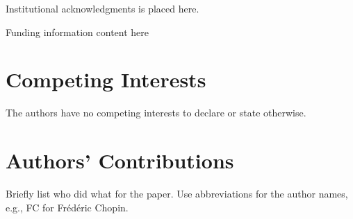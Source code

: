 \documentclass[ProofPDF]{./Styles/Jnls-Template-V3}
\begin{document}
\nolinenumbers
\theendnotes

\begin{acknowledgements}[Acknowledgements]
Institutional acknowledgments is placed here.
\end{acknowledgements}

\begin{fundinginfo}
Funding information content here
\end{fundinginfo}

\section*{Competing Interests}
The authors have no competing interests to declare or state otherwise.

\section*{Authors' Contributions}
Briefly list who did what for the paper.
Use abbreviations for the author names, e.g., FC for Frédéric Chopin.


\begin{authoraff}
\end{authoraff}
\clearpage



\label{endPage_Label}
\end{document}
